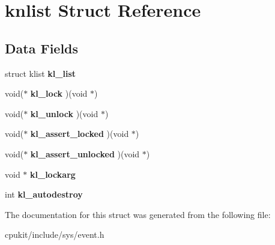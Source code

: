 \hypertarget{structknlist}{}\section{knlist Struct Reference}
\label{structknlist}
\subsection*{Data Fields}
\begin{DoxyCompactItemize}
\item 
\mbox{\label{structknlist_a0721d938625f42307c08ad54410d9578}} 
struct klist {\bfseries kl\+\_\+list}
\item 
\mbox{\label{structknlist_acde5e836e8a91c4fd4dafd6326a765a8}} 
void($\ast$ {\bfseries kl\+\_\+lock} )(void $\ast$)
\item 
\mbox{\label{structknlist_a92f9a52700230e4bb14b312d400bb950}} 
void($\ast$ {\bfseries kl\+\_\+unlock} )(void $\ast$)
\item 
\mbox{\label{structknlist_a688d6ce25421e0c01c1a01d04ff6c683}} 
void($\ast$ {\bfseries kl\+\_\+assert\+\_\+locked} )(void $\ast$)
\item 
\mbox{\label{structknlist_a34daa67906a0777872c5c418ff6fb363}} 
void($\ast$ {\bfseries kl\+\_\+assert\+\_\+unlocked} )(void $\ast$)
\item 
\mbox{\label{structknlist_aadb104578a2e22c8234254cc662419b7}} 
void $\ast$ {\bfseries kl\+\_\+lockarg}
\item 
\mbox{\label{structknlist_a876d306612363a0fc99bd2518ab42ced}} 
int {\bfseries kl\+\_\+autodestroy}
\end{DoxyCompactItemize}


The documentation for this struct was generated from the following file\+:\begin{DoxyCompactItemize}
\item 
cpukit/include/sys/event.\+h\end{DoxyCompactItemize}
